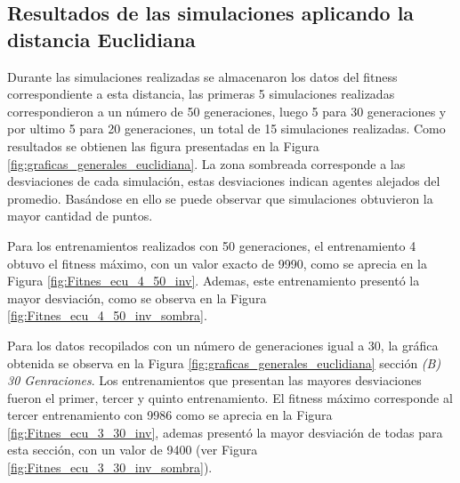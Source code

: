 \documentclass[conference]{IEEEtran}
\begin{document}
\subsection{Resultados de las simulaciones aplicando la distancia Euclidiana}
Durante las simulaciones realizadas se almacenaron los datos del fitness correspondiente a esta distancia, las primeras 5 simulaciones realizadas correspondieron a un número de 50 generaciones, luego 5 para 30 generaciones y por ultimo 5 para 20 generaciones, un total de 15 simulaciones realizadas. Como resultados se obtienen las figura presentadas en la Figura \ref{fig:graficas_generales_euclidiana}. La zona sombreada corresponde a las desviaciones de cada simulación, estas desviaciones indican agentes alejados del promedio. Basándose en ello se puede observar que simulaciones obtuvieron la mayor cantidad de puntos.

Para los entrenamientos realizados con 50 generaciones, el entrenamiento 4 obtuvo el fitness máximo, con un valor exacto de 9990, como se aprecia en la Figura \ref{fig:Fitnes_ecu_4_50_inv}. Ademas, este entrenamiento presentó la mayor desviación, como se observa en la Figura \ref{fig:Fitnes_ecu_4_50_inv_sombra}.



Para los datos recopilados con un número de generaciones igual a 30, la gráfica obtenida se observa en la Figura \ref{fig:graficas_generales_euclidiana} sección \textit{(B) 30 Genraciones}. Los entrenamientos que presentan las mayores desviaciones fueron el primer, tercer y quinto entrenamiento. El fitness máximo corresponde al tercer entrenamiento con 9986 como se aprecia en la Figura \ref{fig:Fitnes_ecu_3_30_inv}, ademas presentó la mayor desviación de todas para esta sección, con un valor de 9400 (ver Figura \ref{fig:Fitnes_ecu_3_30_inv_sombra}).
\end{document}
